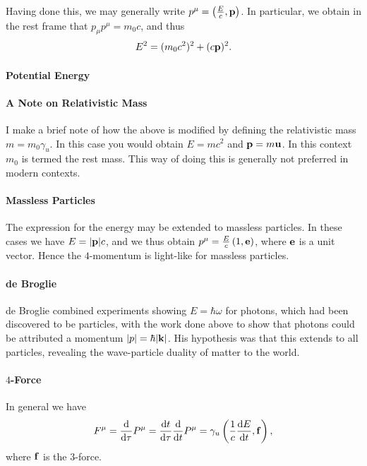 Having done this, we may generally write $p^{\mu} = \left(\frac{E}{c}, \vb{p}\right)$. In particular, we obtain in the rest frame that $p_{\mu}p^{\mu} = m_{0}c$, and thus
\begin{align*}
	E^{2} = (m_{0}c^{2})^{2} + (c\vb{p})^{2}.
\end{align*}

\paragraph{Potential Energy}

\paragraph{A Note on Relativistic Mass}
I make a brief note of how the above is modified by defining the relativistic mass $m = m_{0}\gamma_{u}$. In this case you would obtain $E = mc^{2}$ and $\vb{p} = m\vb{u}$. In this context $m_{0}$ is termed the rest mass. This way of doing this is generally not preferred in modern contexts.

\paragraph{Massless Particles}
The expression for the energy may be extended to massless particles. In these cases we have $E = \abs{\vb{p}}c$, and we thus obtain $p^{\mu} = \frac{E}{c}\left(1, \vb{e}\right)$, where $\vb{e}$ is a unit vector. Hence the $4$-momentum is light-like for massless particles.

\paragraph{de Broglie}
de Broglie combined experiments showing $E = \hbar\omega$ for photons, which had been discovered to be particles, with the work done above to show that photons could be attributed a momentum $\abs{p} = \hbar\abs{\vb{k}}$. His hypothesis was that this extends to all particles, revealing the wave-particle duality of matter to the world.

\paragraph{$4$-Force}
In general we have
\begin{align*}
	F^{\mu} = \dv{\tau}P^{\mu} = \dv{t}{\tau}\dv{t}P^{\mu} = \gamma_{u}\left(\frac{1}{c}\dv{E}{t}, \vb{f}\right),
\end{align*}
where $\vb{f}$ is the $3$-force.

